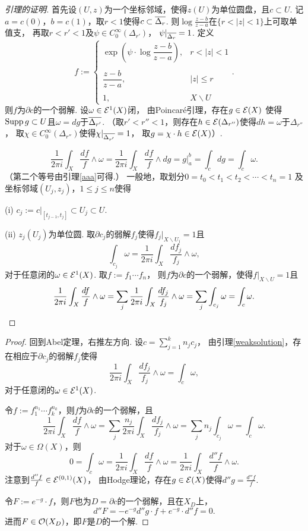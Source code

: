 \begin{proof}[引理的证明]
	首先设$(U,z)$为一个坐标邻域，使得$z(U)$为单位圆盘，且$c\subset U$. 
    记$a=c(0)$，$b=c(1)$，取$r<1$使得$c\subset \overline{\Delta_r}$. 
    则$\log \frac{z-b}{z-a}$在$\{r<\vert z\vert <1\}$上可取单值支，
    再取$r<r'<1$及$\psi\in C_0^\infty(\Delta_{r'})$，
    $\psi|_{\overline{\Delta_r}}=1$. 定义
	$$f:=\begin{cases} \exp \left(\psi \cdot \log \dfrac{z-b}{z-a}\right), &r<|z|<1\\ \\
    \dfrac{z-b}{z-a}, &|z| \leq r\\ \\1, &X\backslash U\end{cases}.$$
	则$f$为$\partial c$的一个弱解. 设$\omega \in \mathcal{E}^1(X)$闭，
    由Poincaré引理，存在$g\in \mathcal{E}(X)$
    使得$\operatorname{Supp} g\subset U$且$\omega=dg$于$\overline{\Delta_{r'}}$.
    （取$r'<r''<1$，则存在$h\in \mathcal{E}(\Delta_{r''})$使得$dh=\omega$于$\Delta_{r''}$，
    取$\chi\in C^\infty_0(\Delta_{r''})$使得$\chi|_{\overline{\Delta_{r'}}}=1$，
    取$g=\chi\cdot h\in \mathcal{E}(X)$）.
	
	$$\frac{1}{2\pi i} \int_X \frac{df}{f}\wedge \omega
    =\frac{1}{2\pi i} \int_X \frac{df}{f}\wedge dg = g|_a^b =\int_c dg=\int_c \omega.$$
    （第二个等号由引理\ref{aaa}可得.）
    一般地，取划分$0=t_0<t_1<t_2<\cdots<t_n=1$
    及坐标邻域$(U_j,z_j)$，$1\leq j\leq n$使得

	(i) $c_j:=c|_{[t_{j-1},t_j]} \subset U_j \subset U$.

	(ii) $z_j(U_j)$为单位圆.		
	取$\partial c_j$的弱解$f_j$使得$f_j|_{X\backslash U_j}=1$且
    \[\int_{c_j}\omega =\frac{1}{2\pi i} \int_X \frac{df_j}{f_j}\wedge \omega,\]
    对于任意闭的$\omega\in \mathcal{E}^1(X)$. 取$f:=f_1\cdots f_n$，
    则$f$为$\partial c$的一个弱解，使得$f|_{X\backslash U}=1$且
	$$\frac{1}{2\pi i} \int_X \frac{df}{f}\wedge \omega
    =\sum_j \frac{1}{2\pi i} \int_X \frac{df_j}{f_j}\wedge \omega 
    =\sum_j \int_{c_j} \omega =\int_c \omega.\qedhere$$
\end{proof}

\begin{proof}
    回到Abel定理，右推左方向. 设$c=\sum\limits_{j=1}^k n_j c_j$，
    由引理\ref{weaksolution}，存在相应于$\partial c_j$的弱解$f_j$使得
    \[\frac{1}{2\pi i} \int_X \frac{df_j}{f_j} \wedge \omega=\int_c \omega,\]
    对于任意闭的$\omega\in \mathcal{E}^1(X)$.

	令$f:=f_1^{n_1}\cdots f_k^{n_k}$，则$f$为$\partial c$的一个弱解，且
	$$\frac{1}{2\pi i} \int_X \frac{df}{f}\wedge \omega 
    =\sum\limits_j \frac{n_j}{2\pi i} \int_X \frac{df_j}{f_j}\wedge \omega 
    =\sum\limits_j n_j \int_{c_j} \omega=\int_c \omega.$$
	对于$\omega\in \Omega(X)$，则
	$$0=\int_c \omega=\frac{1}{2\pi i} \int_X \frac{df}{f}\wedge \omega
    =\frac{1}{2\pi i} \int_X \frac{d'' f}{f} \wedge \omega.$$
	注意到$\frac{d''f}{f}\in \mathcal{E}^{(0,1)}(X)$，
    由Hodge理论，存在$g\in \mathcal{E}(X)$使得$d''g=\frac{d''f}{f}$.

	令$F:=e^{-g}\cdot f$，则$F$也为$D=\partial c$的一个弱解，且在$X_D$上，
	$$d''F=-e^{-g}d''g\cdot f+e^{-g}\cdot d''f=0.$$
	进而$F\in \mathcal{O}(X_D)$，即$F$是$D$的一个解.
\end{proof}
		
